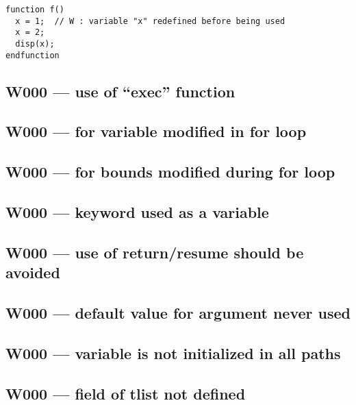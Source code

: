 \begin{verbatim}
function f()
  x = 1;  // W : variable "x" redefined before being used
  x = 2;
  disp(x);
endfunction
\end{verbatim}


\subsection{W000 --- use of ``exec'' function     }




\subsection{W000 --- for variable modified in for loop}




\subsection{W000 --- for bounds modified during for loop}




\subsection{W000 --- keyword used as a variable}




\subsection{W000 --- use of return/resume should be avoided}




\subsection{W000 --- default value for argument never used}




\subsection{W000 --- variable is not initialized in all paths}




\subsection{W000 --- field of tlist not defined}


